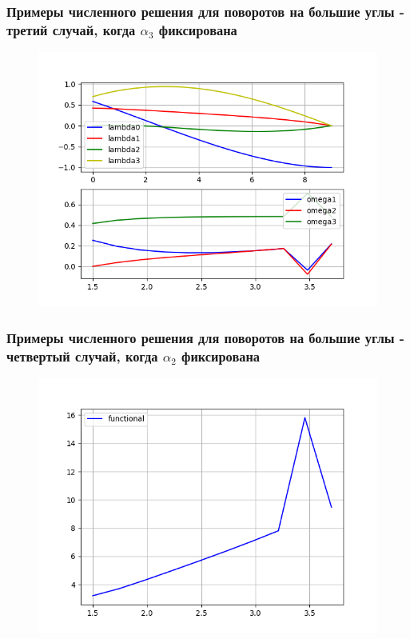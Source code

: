 \documentclass[10pt,utf8,presentation,notheorems,xcolor=dvipsnames,compress]{beamer}
\begin{document}
\begin{frame}
\frametitle{Примеры численного решения для поворотов на большие углы - третий случай, когда $\alpha_3$ фиксирована}
\begin{figure}[H]\label{one}
\center\includegraphics[scale=0.5]{fig/ivp_and_control_1_5-3_7_50.png}
\caption{}
\end{figure}
\end{frame}

\begin{frame}
\frametitle{Примеры численного решения для поворотов на большие углы - четвертый случай, когда $\alpha_2$ фиксирована}
\begin{figure}[H]\label{one}
\center\includegraphics[scale=0.5]{fig/functional_1_5-3_7_50.png}
\caption{}
\end{figure}
\end{frame}
\end{document}
